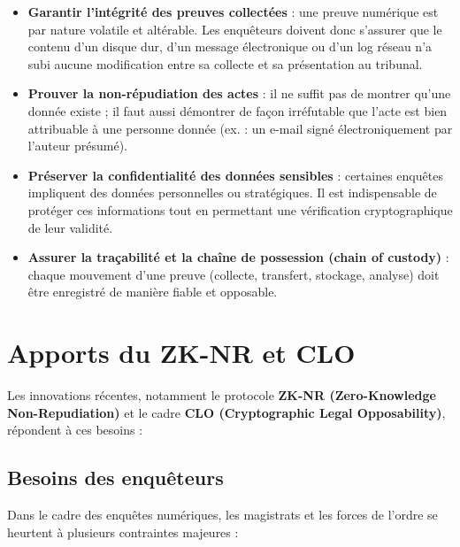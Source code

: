 \documentclass[11pt]{article}
\begin{document}
\begin{itemize}
    \item \textbf{Garantir l’intégrité des preuves collectées} : une preuve numérique est par nature volatile et altérable. Les enquêteurs doivent donc s’assurer que le contenu d’un disque dur, d’un message électronique ou d’un log réseau n’a subi aucune modification entre sa collecte et sa présentation au tribunal.
    
    \item \textbf{Prouver la non-répudiation des actes} : il ne suffit pas de montrer qu’une donnée existe ; il faut aussi démontrer de façon irréfutable que l’acte est bien attribuable à une personne donnée (ex. : un e-mail signé électroniquement par l’auteur présumé).
    
    \item \textbf{Préserver la confidentialité des données sensibles} : certaines enquêtes impliquent des données personnelles ou stratégiques. Il est indispensable de protéger ces informations tout en permettant une vérification cryptographique de leur validité.
    
    \item \textbf{Assurer la traçabilité et la chaîne de possession (chain of custody)} : chaque mouvement d’une preuve (collecte, transfert, stockage, analyse) doit être enregistré de manière fiable et opposable.
\end{itemize}

\section{Apports du ZK-NR et CLO}

Les innovations récentes, notamment le protocole \textbf{ZK-NR (Zero-Knowledge Non-Repudiation)} et le cadre \textbf{CLO (Cryptographic Legal Opposability)}, répondent à ces besoins :

\subsection{Besoins des enquêteurs}

Dans le cadre des enquêtes numériques, les magistrats et les forces de l’ordre se heurtent à plusieurs contraintes majeures :
\end{document}
